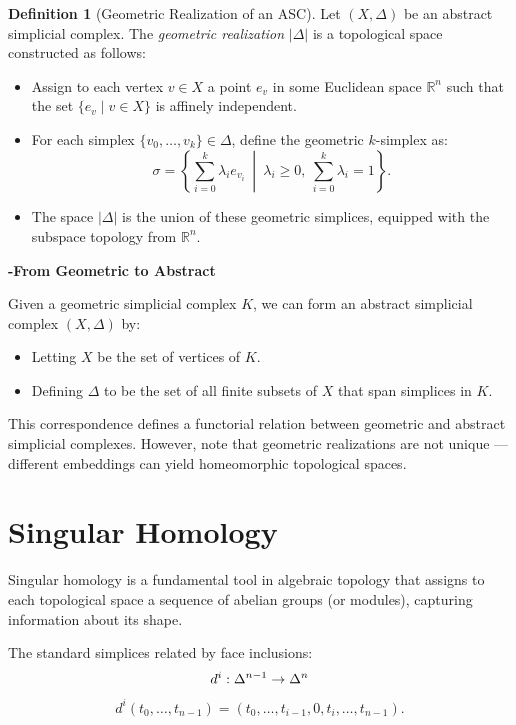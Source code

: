 \documentclass[11pt]{article}
\theoremstyle{definition}
\newtheorem{definition}{Definition}[section]
\theoremstyle{plain}
\begin{document}
\begin{definition}[Geometric Realization of an ASC]
    Let $(X, \Delta)$ be an abstract simplicial complex. The \emph{geometric realization} $|\Delta|$ is a topological space constructed as follows:
    \begin{itemize}
        \item Assign to each vertex $v \in X$ a point $e_v$ in some Euclidean space $\mathbb{R}^n$ such that the set $\{e_v \mid v \in X\}$ is affinely independent.
        \item For each simplex $\{v_0, \dots, v_k\} \in \Delta$, define the geometric $k$-simplex as:
              \[
                  \sigma = \left\{ \sum_{i=0}^{k} \lambda_i e_{v_i} \ \middle| \ \lambda_i \geq 0,\ \sum_{i=0}^{k} \lambda_i = 1 \right\}.
              \]
        \item The space $|\Delta|$ is the union of these geometric simplices, equipped with the subspace topology from $\mathbb{R}^n$.
    \end{itemize}
\end{definition}

\textbf{-From Geometric to Abstract}

Given a geometric simplicial complex $K$, we can form an abstract simplicial complex $(X, \Delta)$ by:
\begin{itemize}
    \item Letting $X$ be the set of vertices of $K$.
    \item Defining $\Delta$ to be the set of all finite subsets of $X$ that span simplices in $K$.
\end{itemize}

This correspondence defines a functorial relation between geometric and abstract simplicial complexes. However, note that geometric realizations are not unique — different embeddings can yield homeomorphic topological spaces.





\section{Singular Homology}

Singular homology is a fundamental tool in algebraic topology that assigns to each topological space a sequence of abelian groups (or modules), capturing information about its shape.


The standard simplices related by face inclusions:
\[
    d^i : \Delta^{n-1} \to \Delta^n \\
\]
\[
    d^i(t_0, \ldots, t_{n-1}) = (t_0, \ldots, t_{i-1}, 0, t_i, \ldots, t_{n-1}).
\]
\end{document}
